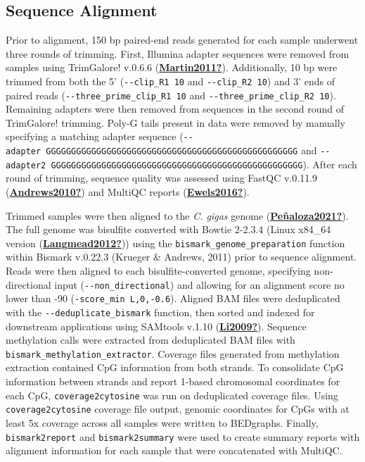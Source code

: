 \documentclass [11pt, proquest] {uwthesis}[2015/03/03]
\begin{document}
\hypertarget{sequence-alignment-2}{%
\subsection{Sequence Alignment}\label{sequence-alignment-2}}

Prior to alignment, 150 bp paired-end reads generated for each sample underwent three rounds of trimming. First, Illumina adapter sequences were removed from samples using TrimGalore! v.0.6.6 (\protect\hyperlink{ref-Martin2011}{\textbf{Martin2011?}}). Additionally, 10 bp were trimmed from both the 5' (\texttt{-\/-clip\_R1\ 10} and \texttt{-\/-clip\_R2\ 10}) and 3' ends of paired reads (\texttt{-\/-three\_prime\_clip\_R1\ 10} and \texttt{-\/-three\_prime\_clip\_R2\ 10}). Remaining adapters were then removed from sequences in the second round of TrimGalore! trimming. Poly-G tails present in data were removed by manually specifying a matching adapter sequence (\texttt{-\/-adapter\ GGGGGGGGGGGGGGGGGGGGGGGGGGGGGGGGGGGGGGGGGGGGGGGGGG} and \texttt{-\/-adapter2\ GGGGGGGGGGGGGGGGGGGGGGGGGGGGGGGGGGGGGGGGGGGGGGGGGG}). After each round of trimming, sequence quality was assessed using FastQC v.0.11.9 (\protect\hyperlink{ref-Andrews2010}{\textbf{Andrews2010?}}) and MultiQC reports (\protect\hyperlink{ref-Ewels2016}{\textbf{Ewels2016?}}).

Trimmed samples were then aligned to the \emph{C. gigas} genome (\protect\hyperlink{ref-Peuxf1aloza2021}{\textbf{Peñaloza2021?}}). The full genome was bisulfite converted with Bowtie 2-2.3.4 (Linux x84\_64 version (\protect\hyperlink{ref-Langmead2012}{\textbf{Langmead2012?}})) using the \texttt{bismark\_genome\_preparation} function within Bismark v.0.22.3 (Krueger \& Andrews, 2011) prior to sequence alignment. Reads were then aligned to each bisulfite-converted genome, specifying non-directional input (\texttt{-\/-non\_directional}) and allowing for an alignment score no lower than -90 (\texttt{-score\_min\ L,0,-0.6}). Aligned BAM files were deduplicated with the \texttt{-\/-deduplicate\_bismark} function, then sorted and indexed for downstream applications using SAMtools v.1.10 (\protect\hyperlink{ref-Li2009}{\textbf{Li2009?}}). Sequence methylation calls were extracted from deduplicated BAM files with \texttt{bismark\_methylation\_extractor}. Coverage files generated from methylation extraction contained CpG information from both strands. To consolidate CpG information between strands and report 1-based chromosomal coordinates for each CpG, \texttt{coverage2cytosine} was run on deduplicated coverage files. Using \texttt{coverage2cytosine} coverage file output, genomic coordinates for CpGs with at least 5x coverage across all samples were written to BEDgraphs. Finally, \texttt{bismark2report} and \texttt{bismark2summary} were used to create summary reports with alignment information for each sample that were concatenated with MultiQC.
\end{document}
